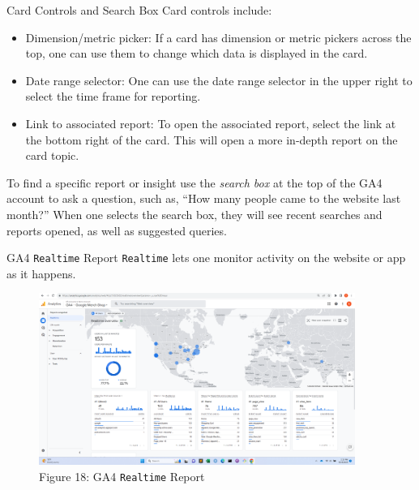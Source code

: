 \documentclass[pdf]{beamer}
\theoremstyle{remark}
\theoremstyle{definition}
\begin{document}
\begin{frame}[t]{Card Controls and Search Box}
Card controls include: \\
\vspace{0.5ex}
\small
\begin{itemize}
\item Dimension/metric picker: If a card has dimension or metric pickers across the top, one can use them to change which data is displayed in the card. 
\item Date range selector: One can use the date range selector in the upper right to select the time frame for reporting. 
\item Link to associated report: To open the associated report, select the link at the bottom right of the card. This will open a more in-depth report on the card topic.
\end{itemize}
\normalsize
To find a specific report or insight use the \textit{search box} at the top of the GA4 account to ask a question, such as,  ``How many people came to the website last month?'' When one selects the search box, they will see recent searches and reports opened, as well as suggested queries.
\end{frame}

\begin{frame}[t]{GA4 \texttt{Realtime} Report}
\texttt{Realtime} lets one monitor activity on the website or app as it happens. %
\begin{figure}[htbp]
  \captionsetup{justification=centering}
  \includegraphics[height=5.6cm, trim=1.5cm 0.0cm 2.0cm 0.0cm width=5.6cm]{Images/GA4_3_091923_Realtime_Reports.png}
  \caption{Figure {\color{franklinblue} 18}: GA4 \texttt{Realtime} Report}
\end{figure}
\end{frame}
\end{document}

